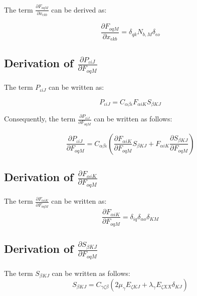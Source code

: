 \documentclass[oneside,11pt,times]{book}
\newcommand\omicron{o}
\begin{document}
The term $\frac{\partial F_{ \omicron q M}}{\partial x_{ \epsilon k b}}$ can be derived as:

\begin{equation}
\label{dFdx}
\frac{\partial F_{\omicron q M}}{\partial x_{\epsilon k b}} = \delta_{qk}N_{b,M} \delta_{\epsilon \omicron}
\end{equation}

\subsection{ Derivation of $\frac{\partial P_{ \iota i J}}{\partial F_{ \omicron q M}}$ \label{stochtanmoduli}}

The term $P_{ \iota i J}$ can be written as:

\begin{equation}
P_{ \iota i J} = C_{\alpha \beta \iota} F_{ \alpha i K}S_{ \beta K J}
\end{equation}

Consequently, the term $\frac{\partial P_{ \iota i J}}{\partial F_{ \omicron q M}}$ can be written as follows:

\begin{equation}
\frac{\partial P_{ \iota i J}}{\partial F_{ \omicron q M}} = C_{\alpha \beta \iota} (\frac{\partial F_{ \alpha i K}}{\partial F_{ \omicron q M}} S_{\beta K J} + F_{ \alpha i K} \frac{\partial S_{ \beta K J}}{\partial F_{ \omicron q M}})
\end{equation}

\subsection{ Derivation of $\frac{\partial F_{ \alpha i K}}{\partial F_{ \omicron q M}}$ }

The term $\frac{\partial F_{ \alpha i K}}{\partial F_{ \omicron q M}}$ can be written as:
\begin{equation}
\frac{\partial F_{ \alpha i K}}{\partial F_{ \omicron q M}} = \delta_{iq} \delta_{\alpha \omicron} \delta_{KM}
\end{equation}

\subsection{ Derivation of $\frac{\partial S_{\beta K J}}{\partial F_{ \omicron q M}}$ }

The term $S_{\beta KJ}$ can be written as follows:
\begin{equation}
S_{ \beta KJ} =  C_{\gamma \zeta \beta} (2\mu_{\gamma} E_{ \zeta KJ} + \lambda_{\gamma} E_{ \zeta XX} \delta_{KJ})
\end{equation}
\end{document}
